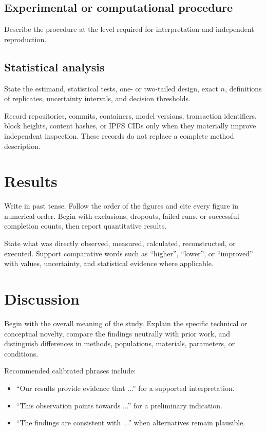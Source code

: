 \documentclass[
  blockchain,
  computerscience,
  chemistry,
  biochemistry,
  biology
]{genesisl1-paper}
\begin{document}
\subsection{Experimental or computational procedure}
Describe the procedure at the level required for interpretation and independent
reproduction.

\subsection{Statistical analysis}
State the estimand, statistical tests, one- or two-tailed design, exact \(n\), definitions
of replicates, uncertainty intervals, and decision thresholds.

\begin{GenesisProvenance}
Record repositories, commits, containers, model versions, transaction identifiers,
block heights, content hashes, or IPFS CIDs only when they materially improve
independent inspection. These records do not replace a complete method description.
\end{GenesisProvenance}

\section{Results}
Write in past tense. Follow the order of the figures and cite every figure in numerical
order. Begin with exclusions, dropouts, failed runs, or successful completion counts,
then report quantitative results.

\begin{GenesisEvidence}
State what was directly observed, measured, calculated, reconstructed, or executed.
Support comparative words such as ``higher'', ``lower'', or ``improved'' with values,
uncertainty, and statistical evidence where applicable.
\end{GenesisEvidence}

\section{Discussion}
Begin with the overall meaning of the study. Explain the specific technical or conceptual
novelty, compare the findings neutrally with prior work, and distinguish differences in
methods, populations, materials, parameters, or conditions.

Recommended calibrated phrases include:
\begin{itemize}
  \item ``Our results provide evidence that ...'' for a supported interpretation.
  \item ``This observation points towards ...'' for a preliminary indication.
  \item ``The findings are consistent with ...'' when alternatives remain plausible.
\end{itemize}
\end{document}
